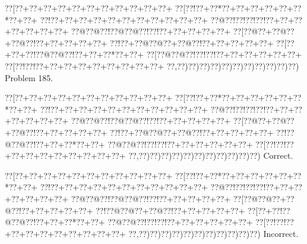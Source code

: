 \documentclass[a5paper]{article}
\begin{document}
\newpage
\begin{center}
{\goo
\0??[\0??+\0??+\0??+\0??+\0??+\0??+\0??+\0??+\0??+\0??+\0??+
\0??[\0??!\0??+\0??*\0??+\0??+\0??+\0??+\0??+\0??*\0??+\0??+
\0??!\0??+\0??+\0??+\0??+\0??+\0??+\0??+\0??+\0??+\0??+\0??+
\0??@\0??!\0??!\0??!\0??!\0??+\0??+\0??+\0??+\0??+\0??+\0??+
\0??@\0??@\0??!\0??@\0??@\0??!\0??!\0??+\0??+\0??+\0??+\0??+
\0??[\0??@\0??+\0??@\0??+\0??@\0??!\0??+\0??+\0??+\0??+\0??+
\0??!\0??+\0??@\0??@\0??+\0??@\0??!\0??+\0??+\0??+\0??+\0??+
\0??[\0??+\0??+\0??!\0??@\0??@\0??!\0??+\0??+\0??*\0??+\0??+
\0??[\0??@\0??@\0??!\0??!\0??!\0??+\0??+\0??+\0??+\0??+\0??+
\0??[\0??!\0??!\0??+\0??+\0??+\0??+\0??+\0??+\0??+\0??+\0??+
\0??,\0??)\0??)\0??)\0??)\0??)\0??)\0??)\0??)\0??)\0??)\0??)
}
Problem 185.

\end{center}
\begin{center}
{\goo
\0??[\0??+\0??+\0??+\0??+\0??+\0??+\0??+\0??+\0??+\0??+\0??+
\0??[\0??!\0??+\0??*\0??+\0??+\0??+\0??+\0??+\0??*\0??+\0??+
\0??!\0??+\0??+\0??+\0??+\0??+\0??+\0??+\0??+\0??+\0??+\0??+
\0??@\0??!\0??!\0??!\0??!\0??+\0??+\0??+\0??+\0??+\0??+\0??+
\0??@\0??@\0??!\0??@\0??@\0??!\0??!\0??+\0??+\0??+\0??+\0??+
\0??[\0??@\0??+\0??@\0??+\0??@\0??!\0??+\0??+\0??+\0??+\0??+
\0??!\0??+\0??@\0??@\0??+\0??@\0??!\0??+\0??+\0??+\0??+\0??+
\0??!\0??@\0??@\0??!\0??+\0??+\0??*\0??+\0??+
\0??@\0??@\0??!\0??!\0??!\0??+\0??+\0??+\0??+\0??+\0??+
\0??[\0??!\0??!\0??+\0??+\0??+\0??+\0??+\0??+\0??+\0??+\0??+
\0??,\0??)\0??)\0??)\0??)\0??)\0??)\0??)\0??)\0??)\0??)\0??)
}
Correct. 

\end{center}
\begin{center}
{\goo
\0??[\0??+\0??+\0??+\0??+\0??+\0??+\0??+\0??+\0??+\0??+\0??+
\0??[\0??!\0??+\0??*\0??+\0??+\0??+\0??+\0??+\0??*\0??+\0??+
\0??!\0??+\0??+\0??+\0??+\0??+\0??+\0??+\0??+\0??+\0??+\0??+
\0??@\0??!\0??!\0??!\0??!\0??+\0??+\0??+\0??+\0??+\0??+\0??+
\0??@\0??@\0??!\0??@\0??@\0??!\0??!\0??+\0??+\0??+\0??+\0??+
\0??[\0??@\0??@\0??+\0??@\0??!\0??+\0??+\0??+\0??+\0??+
\0??!\0??@\0??@\0??+\0??@\0??!\0??+\0??+\0??+\0??+\0??+
\0??[\0??+\0??!\0??@\0??@\0??!\0??+\0??+\0??*\0??+\0??+
\0??@\0??@\0??!\0??!\0??!\0??+\0??+\0??+\0??+\0??+\0??+
\0??[\0??!\0??!\0??+\0??+\0??+\0??+\0??+\0??+\0??+\0??+\0??+
\0??,\0??)\0??)\0??)\0??)\0??)\0??)\0??)\0??)\0??)\0??)\0??)
}
Incorrect. 

\end{center}
\newpage
\end{document}
